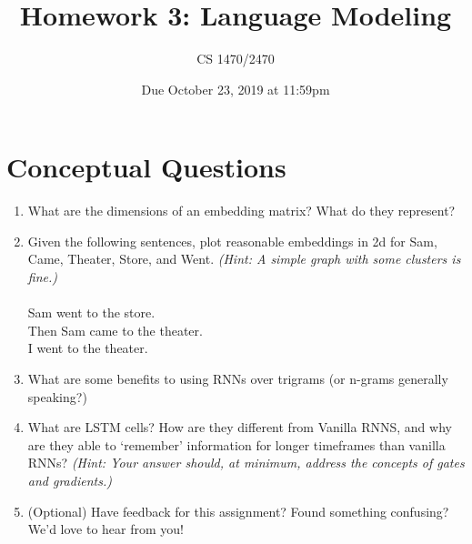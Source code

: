 \documentclass{article}
\title{Homework 3: Language Modeling}
\date{Due October 23, 2019 at 11:59pm}
\author{CS 1470/2470}
\begin{document}
\maketitle

\section{Conceptual Questions}
\begin{enumerate}
\item What are the dimensions of an embedding matrix? What do they represent?

\item Given the following sentences, plot reasonable embeddings in 2d for Sam, Came, Theater, Store, and Went. \emph{(Hint: A simple graph with some clusters is fine.)}\\\\
Sam went to the store.\\
Then Sam came to the theater.\\
I went to the theater.\\

\item What are some benefits to using RNNs over trigrams (or n-grams generally speaking?)

\item What are LSTM cells? How are they different from Vanilla RNNS, and why are they able to ‘remember’ information for longer timeframes than vanilla RNNs? \emph{(Hint: Your answer should, at minimum, address the concepts of gates and gradients.)}

\item (Optional) Have feedback for this assignment? Found something confusing? We'd love to hear from you!

\end{enumerate}
\end{document}
